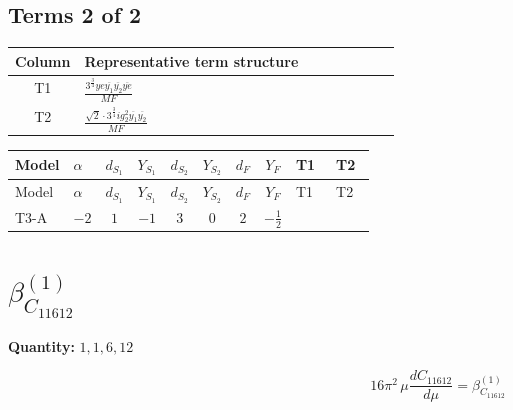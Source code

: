 \documentclass[8pt]{article}
\begin{document}
\begin{landscape}
\subsection*{Terms 2 of 2}
\begin{center}
\begin{tabular}{@{}c >{\raggedright\arraybackslash}p{0.82\linewidth}@{}}
\toprule
Column & Representative term structure \\
\midrule
T1 & \(\displaystyle \frac{3^{\frac{3}{4}} ye \overline{y_{1}} \overline{y_{2}} \overline{ye}}{MF}\) \\
\midrule
T2 & \(\displaystyle \frac{\sqrt{2} \cdot 3^{\frac{3}{4}} i g_{2}^{2} \overline{y_{1}} \overline{y_{2}}}{MF}\) \\
\midrule
\bottomrule
\end{tabular}
\end{center}
\smallskip
\tiny
\begin{longtable}{@{}llcccccc >{\raggedright\arraybackslash}p{0.21\linewidth} >{\raggedright\arraybackslash}p{0.21\linewidth}@{}}
\toprule
Model & $\alpha$ & $d_{S_1}$ & $Y_{S_1}$ & $d_{S_2}$ & $Y_{S_2}$ & $d_F$ & $Y_F$ & T1 & T2 \\
\midrule
\endfirsthead
\toprule
Model & $\alpha$ & $d_{S_1}$ & $Y_{S_1}$ & $d_{S_2}$ & $Y_{S_2}$ & $d_F$ & $Y_F$ & T1 & T2 \\
\midrule
\endhead
T3-A & $-2$ & $1$ & $-1$ & $3$ & $0$ & $2$ & $-\frac{1}{2}$ & \scriptsize\adjustbox{max width=\linewidth}{$\begin{gathered} \frac{3^{\frac{3}{4}} ye \overline{y_{1}} \overline{y_{2}} \overline{ye}}{12 MF}\end{gathered}$} & \scriptsize\adjustbox{max width=\linewidth}{$\begin{gathered} - \frac{\sqrt{2} \cdot 3^{\frac{3}{4}} i g_{2}^{2} \overline{y_{1}} \overline{y_{2}}}{3 MF}\end{gathered}$} \\
\midrule
\bottomrule
\end{longtable}
\clearpage
\section*{$\beta_{C_{11612}}^{(1)}$}
\noindent\textbf{Quantity: }$\mathrm{1,1,6,12}$\par\smallskip
\[16\pi^2\,\mu\frac{d C_{11612}}{d\mu}=\beta_{C_{11612}}^{(1)}\]

\end{landscape}
\end{document}
